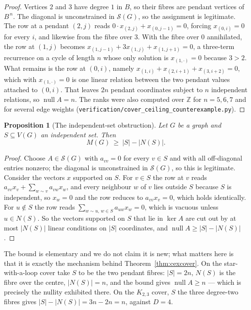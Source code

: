 \documentclass[11pt]{article}
\newtheorem{proposition}[theorem]{Proposition}
\theoremstyle{definition}
\begin{document}
\begin{proof}
Vertices $2$ and $3$ have degree $1$ in $B$, so their fibres are pendant
vertices of $B^{\,n}$. The diagonal is unconstrained in $\mathcal S(G)$, so the
assignment is legitimate. The row at a pendant $(2,j)$ reads
$0\cdot x_{(2,j)}+x_{(0,j-1)}=0$, forcing $x_{(0,i)}=0$ for every $i$, and
likewise from the fibre over $3$. With the fibre over $0$ annihilated, the row
at $(1,j)$ becomes $x_{(1,j-1)}+3x_{(1,j)}+x_{(1,j+1)}=0$, a three-term
recurrence on a cycle of length $n$ whose only solution is $x_{(1,\cdot)}=0$
because $3>2$. What remains is the row at $(0,i)$, namely
$x_{(1,i)}+x_{(2,i+1)}+x_{(3,i+2)}=0$, which with $x_{(1,\cdot)}=0$ is one
linear relation between the two pendant values attached to $(0,i)$. That leaves
$2n$ pendant coordinates subject to $n$ independent relations, so
$\operatorname{null}A=n$. The ranks were also computed over $\mathbb Z$ for
$n=5,6,7$ and for several edge weights
(\texttt{verification/cover\_ceiling\_counterexample.py}).
\end{proof}

\begin{proposition}[The independent-set obstruction]\label{prop:indobs}
Let $G$ be a graph and $S\subseteq V(G)$ an independent set. Then
\[
  M(G)\ \ge\ |S|-|N(S)| .
\]
\end{proposition}

\begin{proof}
Choose $A\in\mathcal S(G)$ with $a_{vv}=0$ for every $v\in S$ and with all
off-diagonal entries nonzero; the diagonal is unconstrained in
$\mathcal S(G)$, so this is legitimate. Consider the vectors $x$ supported on
$S$. For $v\in S$ the row at $v$ reads $a_{vv}x_v+\sum_{w\sim v}a_{vw}x_w$, and
every neighbour $w$ of $v$ lies outside $S$ because $S$ is independent, so
$x_w=0$ and the row reduces to $a_{vv}x_v=0$, which holds identically. For
$u\notin S$ the row reads $\sum_{w\sim u,\,w\in S}a_{uw}x_w=0$, which is
vacuous unless $u\in N(S)$. So the vectors supported on $S$ that lie in $\ker A$
are cut out by at most $|N(S)|$ linear conditions on $|S|$ coordinates, and
$\operatorname{null}A\ge|S|-|N(S)|$.
\end{proof}

The bound is elementary and we do not claim it is new; what matters here is
that it is exactly the mechanism behind Theorem~\ref{thm:cexcover}. On the
star-with-a-loop cover take $S$ to be the two pendant fibres: $|S|=2n$,
$N(S)$ is the fibre over the centre, $|N(S)|=n$, and the bound gives
$\operatorname{null}A\ge n$ --- which is precisely the nullity exhibited there.
On the $K_{2,3}$ cover, $S$ the three degree-two fibres gives
$|S|-|N(S)|=3n-2n=n$, against $D=4$.
\end{document}
